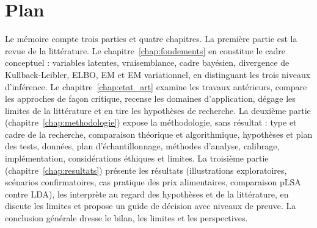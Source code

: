 \section*{Plan}
Le mémoire compte trois parties et quatre chapitres. La première partie est la revue de la littérature. Le chapitre~\ref{chap:fondements} en constitue le cadre conceptuel : variables latentes, vraisemblance, cadre bayésien, divergence de Kullback-Leibler, ELBO, EM et EM variationnel, en distinguant les trois niveaux d'inférence. Le chapitre~\ref{chap:etat_art} examine les travaux antérieurs, compare les approches de façon critique, recense les domaines d'application, dégage les limites de la littérature et en tire les hypothèses de recherche. La deuxième partie (chapitre~\ref{chap:methodologie}) expose la méthodologie, sans résultat : type et cadre de la recherche, comparaison théorique et algorithmique, hypothèses et plan des tests, données, plan d'échantillonnage, méthodes d'analyse, calibrage, implémentation, considérations éthiques et limites. La troisième partie (chapitre~\ref{chap:resultats}) présente les résultats (illustrations exploratoires, scénarios confirmatoires, cas pratique des prix alimentaires, comparaison pLSA contre LDA), les interprète au regard des hypothèses et de la littérature, en discute les limites et propose un guide de décision avec niveaux de preuve. La conclusion générale dresse le bilan, les limites et les perspectives.
